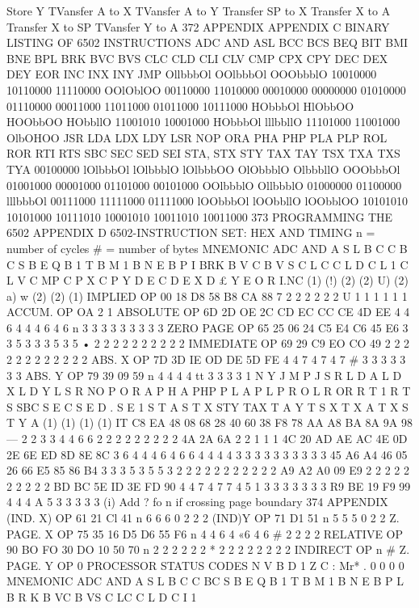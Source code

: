 {{{{{{{{{{{{{{{{{{{{{{{{{{{{{{{{{{{{{{{{{{{{{{{{{{{{{{{{{{{{{{{{{{{{{{{{{{{{{{{{{{{{{{{{{{{{{{{{{{{{{{{{{{{{{{{{{{{{{{{{{{{{{{{{{{{{{{{{{{{{Store Y
TVansfer A to X
TVansfer A to Y
Transfer SP to X
Transfer X to A
Transfer X to SP
TVansfer Y to A
372
APPENDIX
APPENDIX C
BINARY LISTING OF 6502 INSTRUCTIONS
ADC
AND
ASL
BCC
BCS
BEQ
BIT
BMI
BNE
BPL
BRK
BVC
BVS
CLC
CLD
CLI
CLV
CMP
CPX
CPY
DEC
DEX
DEY
EOR
INC
INX
INY
JMP
OllbbbOl
OOlbbbOl
OOObbblO
10010000
10110000
11110000
OOlOblOO
00110000
11010000
00010000
00000000
01010000
01110000
00011000
11011000
01011000
10111000
HObbbOl
HlObbOO
HOObbOO
HObbllO
11001010
10001000
HObbbOl
lllbbllO
11101000
11001000
OlbOHOO
JSR
LDA
LDX
LDY
LSR
NOP
ORA
PHA
PHP
PLA
PLP
ROL
ROR
RTI
RTS
SBC
SEC
SED
SEI
STA,
STX
STY
TAX
TAY
TSX
TXA
TXS
TYA
00100000
lOlbbbOl
lOlbbblO
lOlbbbOO
OlObbblO
OlbbbllO
OOObbbOl
01001000
00001000
01101000
00101000
OOlbbblO
OllbbblO
01000000
01100000
lllbbbOl
00111000
11111000
01111000
lOObbbOl
lOObbllO
lOObblOO
10101010
10101000
10111010
10001010
10011010
10011000
373
PROGRAMMING THE 6502
APPENDIX D
6502-INSTRUCTION SET: HEX AND TIMING
n = number of cycles # = number of bytes
MNEMONIC
ADC
AND
A S L
B C C
B C S
B E Q
B 1 T
B M 1
B N E
B P I
BRK
B V C
B V S
C L C
C L D
C L 1
C L V
C MP
C P X
C P Y
D E C
D E X
D £ Y
E O R
I.NC
(1)
(!)
(2)
(2)
U)
(2)
a)
w
(2)
(2)
(1)
IMPLIED
OP
00
18
D8
58
B8
CA
88
7
2
2
2
2
2
2
U
1
1
1
1
1
1
ACCUM.
OP
OA 2 1
ABSOLUTE
OP
6D
2D
OE
2C
CD
EC
CC
CE
4D
EE
4
4
6
4
4
4
6
4
6
n
3
3
3
3
3
3
3
3
3
ZERO PAGE
OP
65
25
06
24
C5
E4
C6
45
E6
3
3
5
3
3
3
5
3
5
•
2
2
2
2
2
2
2
2
2
2
IMMEDIATE
OP
69
29
C9
EO
CO
49
2
2
2
2
2
2
2
2
2
2
2
2
ABS. X
OP
7D
3D
IE
OD
DE
5D
FE
4
4
7
4
7
4
7
#
3
3
3
3
3
3
3
ABS. Y
OP
79
39
09
59
n
4
4
4
4
tt
3
3
3
3
1 N Y
J M P
J S R
L D A
L D X
L D Y
L S R
NO P
O R A
P H A
PHP
P L A
P L P
R O L
R OR
R T 1
R T S
SBC
S E C
S E D
. S E 1
S T A
S T X
STY
TAX
T A Y
T S X
T X A
T X S
T Y A
(1)
(1)
(1)
(1)
IT
C8
EA
48
08
68
28
40
60
38
F8
78
AA
A8
BA
8A
9A
98
—
2
2
3
3
4
4
6
6
2
2
2
2
2
2
2
2
2
4A
2A
6A
2
2
1
1
1
4C
20
AD
AE
AC
4E
0D
2E
6E
ED
8D
8E
8C
3
6
4
4
4
6
4
6
6
4
4
4
4
3
3
3
3
3
3
3
3
3
3
45
A6
A4
46
05
26
66
E5
85
86
B4
3
3
3
5
3
5
5
3
2
2
2
2
2
2
2
2
2
2
2
A9
A2
A0
09
E9
2
2
2
2
2
2
2
2
2
2
BD
BC
5E
ID
3E
FD
90
4
4
7
4
7
7
4
5
1
3
3
3
3
3
3
3
R9
BE
19
F9
99
4
4
4
A
5
3
3
3
3
3
(i) Add ? fo n if crossing page boundary
374
APPENDIX
(IND. X)
OP
61
21
Cl
41
n
6
6
6
0
2
2
2
(IND)Y
OP
71
D1
51
n
5
5
5
0
2
2
Z. PAGE. X
OP
75
35
16
D5
D6
55
F6
n
4
4
6
4
«6
4
6
#
2
2
2
2
RELATIVE
OP
90
BO
FO
30
DO
10
50
70
n
2
2
2
2
2
2
*
2
2
2
2
2
2
2
2
INDIRECT
OP n #
Z. PAGE. Y
OP 0
PROCESSOR
STATUS CODES
N V B D 1 Z C
:
Mr* .
0
0
0
0
MNEMONIC
ADC
AND
A S L
B C C
BC S
B E Q
B 1 T
B M 1
B N E
B P L
B R K
B VC
B VS
C LC
C L D
C I 1
}}}}}}}}}}}}}}}}}}}}}}}}}}}}}}}}}}}}}}}}}}}}}}}}}}}}}}}}}}}}}}}}}}}}}}}}}}}}}}}}}}}}}}}}}}}}}}}}}}}}}}}}}}}}}}}}}}}}}}}}}}}}}}}}}}}}}}}}}}}}
